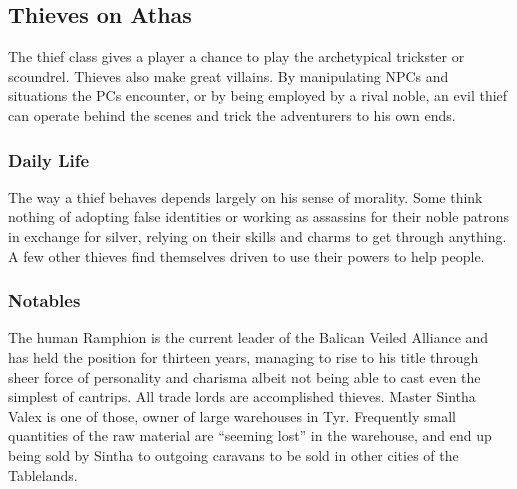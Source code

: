 






\subsection{Thieves on Athas}

The thief class gives a player a chance to play the archetypical trickster or scoundrel. Thieves also make great villains. By manipulating NPCs and situations the PCs encounter, or by being employed by a rival noble, an evil thief can operate behind the scenes and trick the adventurers to his own ends.

\subsubsection{Daily Life}
The way a thief behaves depends largely on his sense of morality. Some think nothing of adopting false identities or working as assassins for their noble patrons in exchange for silver, relying on their skills and charms to get through anything. A few other thieves find themselves driven to use their powers to help people.

\subsubsection{Notables}
The human Ramphion is the current leader of the Balican Veiled Alliance and has held the position for thirteen years, managing to rise to his title through sheer force of personality and charisma albeit not being able to cast even the simplest of cantrips. All trade lords are accomplished thieves. Master Sintha Valex is one of those, owner of large warehouses in Tyr. Frequently small quantities of the raw material are ``seeming lost'' in the warehouse, and end up being sold by Sintha to outgoing caravans to be sold in other cities of the Tablelands.

